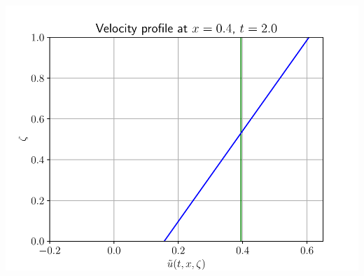 \documentclass[10pt]{beamer}
\begin{document}
\begin{frame}
        \includegraphics[scale=0.3]{Figures/velocity_profile_0_4.pdf}
      \end{frame}
\end{document}
